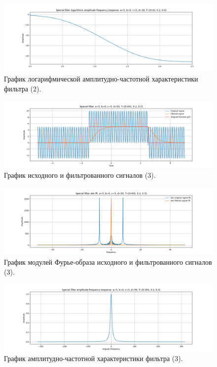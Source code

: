 \documentclass[a4paper, 12pt]{article}
\begin{document}
    \begin{figure}[H]
        \centering
        \includegraphics[scale=0.4]{2_fl2_lafr.png}
        \captionsetup{skip=0pt}
        \caption{График логарифмической амплитудно-частотной характеристики фильтра (2).}
        \label{fig:filinlafr22}
    \end{figure}
    \begin{figure}[H]
        \centering
        \includegraphics[scale=0.4]{3_fl2.png}
        \captionsetup{skip=0pt}
        \caption{График исходного и фильтрованного сигналов (3).}
        \label{fig:filin23}
    \end{figure}
    \begin{figure}[H]
        \centering
        \includegraphics[scale=0.4]{3_fl2_abs.png}
        \captionsetup{skip=0pt}
        \caption{График модулей Фурье-образа исходного и фильтрованного сигналов (3).}
        \label{fig:filinabs23}
    \end{figure}
    \begin{figure}[H]
        \centering
        \includegraphics[scale=0.4]{3_fl2_afr.png}
        \captionsetup{skip=0pt}
        \caption{График амплитудно-частотной характеристики фильтра (3).}
        \label{fig:filinafr23}
    \end{figure}
\end{document}
